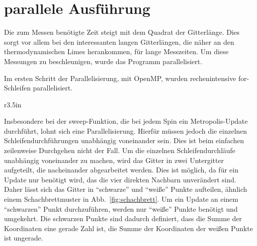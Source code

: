 	
	\section{parallele Ausführung}
	\label{sec:parallelimplementierung}


	
	Die zum Messen benötigte Zeit steigt mit dem Quadrat der Gitterlänge. Dies sorgt vor allem bei den interessanten langen Gitterlängen, die näher an den thermodynamischen Limes herankommen, für lange Messzeiten. Um diese Messungen zu beschleunigen, wurde das Programm parallelisiert.
	
	Im ersten Schritt der Parallelisierung, mit OpenMP, wurden rechenintensive for-Schleifen parallelisiert.
	
	
	\begin{wrapfigure}{r}{3.5in}
		\centering
		
		\caption{Schachbrettmuster}
		\label{fig:schachbrett}
	\end{wrapfigure}
	
	Insbesondere bei der sweep-Funktion, die bei jedem Spin ein Metropolis-Update durchführt, lohnt sich eine Parallelisierung. Hierfür müssen jedoch die einzelnen Schleifendurchführungen unabhängig voneinander sein. Dies ist beim einfachen zeilenweise Durchgehen nicht der Fall.
	Um die einzelnen Schleifendurchläufe unabhängig voneinander zu machen, wird das Gitter in zwei Untergitter aufgeteilt, die nacheinander abgearbeitet werden. Dies ist möglich, da für ein Update nur benötigt wird, das die vier direkten Nachbarn unverändert sind. Daher lässt sich das Gitter in \enquote{schwarze}
	und \enquote{weiße} Punkte aufteilen, ähnlich einem Schachbrettmuster in Abb.~\ref{fig:schachbrett}. Um ein Update an einem \enquote{schwarzen} Punkt durchzuführen, werden nur \enquote{weiße} Punkte benötigt und umgekehrt. Die schwarzen Punkte sind dadurch definiert, dass die Summe der Koordinaten eine gerade Zahl ist, die Summe der Koordinaten der weißen Punkte ist ungerade.
	
